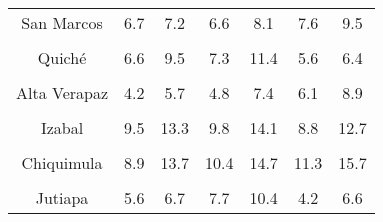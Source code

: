 \begin{tabular}[t]{ccccccc}
San Marcos & 6.7 & 7.2 & 6.6 & 8.1 & 7.6 & 9.5\\
\cellcolor[HTML]{B6B3FF}{Huehuetenango} & \cellcolor[HTML]{B6B3FF}{9.7} & \cellcolor[HTML]{B6B3FF}{13.0} & \cellcolor[HTML]{B6B3FF}{9.0} & \cellcolor[HTML]{B6B3FF}{12.5} & \cellcolor[HTML]{B6B3FF}{7.5} & \cellcolor[HTML]{B6B3FF}{11.2}\\
Quiché & 6.6 & 9.5 & 7.3 & 11.4 & 5.6 & 6.4\\
\cellcolor[HTML]{B6B3FF}{Baja Verapaz} & \cellcolor[HTML]{B6B3FF}{6.5} & \cellcolor[HTML]{B6B3FF}{10.1} & \cellcolor[HTML]{B6B3FF}{9.0} & \cellcolor[HTML]{B6B3FF}{13.0} & \cellcolor[HTML]{B6B3FF}{6.1} & \cellcolor[HTML]{B6B3FF}{11.0}\\
Alta Verapaz & 4.2 & 5.7 & 4.8 & 7.4 & 6.1 & 8.9\\
\cellcolor[HTML]{B6B3FF}{Petén} & \cellcolor[HTML]{B6B3FF}{12.7} & \cellcolor[HTML]{B6B3FF}{17.5} & \cellcolor[HTML]{B6B3FF}{14.2} & \cellcolor[HTML]{B6B3FF}{22.5} & \cellcolor[HTML]{B6B3FF}{11.4} & \cellcolor[HTML]{B6B3FF}{18.5}\\
Izabal & 9.5 & 13.3 & 9.8 & 14.1 & 8.8 & 12.7\\
\cellcolor[HTML]{B6B3FF}{Zacapa} & \cellcolor[HTML]{B6B3FF}{6.5} & \cellcolor[HTML]{B6B3FF}{10.5} & \cellcolor[HTML]{B6B3FF}{6.8} & \cellcolor[HTML]{B6B3FF}{10.6} & \cellcolor[HTML]{B6B3FF}{8.6} & \cellcolor[HTML]{B6B3FF}{12.2}\\
Chiquimula & 8.9 & 13.7 & 10.4 & 14.7 & 11.3 & 15.7\\
\cellcolor[HTML]{B6B3FF}{Jalapa} & \cellcolor[HTML]{B6B3FF}{10.8} & \cellcolor[HTML]{B6B3FF}{16.8} & \cellcolor[HTML]{B6B3FF}{11.8} & \cellcolor[HTML]{B6B3FF}{16.8} & \cellcolor[HTML]{B6B3FF}{7.4} & \cellcolor[HTML]{B6B3FF}{10.4}\\
Jutiapa & 5.6 & 6.7 & 7.7 & 10.4 & 4.2 & 6.6\\
\bottomrule
\end{tabular}

